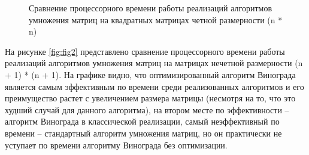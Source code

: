 \begin{figure}[h!]
	
	
	\caption{Сравнение процессорного времени работы реализаций алгоритмов умножения матриц на квадратных матрицах четной размерности (n * n)}
	
	\label{fig:fig1}
	
\end{figure}

\clearpage
На рисунке \ref{fig:fig2} представлено сравнение процессорного времени работы реализаций алгоритмов умножения матриц на матрицах нечетной размерности (n + 1) * (n + 1). 
На графике видно, что оптимизированный алгоритм Винограда является самым эффективным по времени среди реализованных алгоритмов и его преимущество растет с увеличением размера матрицы (несмотря на то, что это худший случай для данного алгоритма), на втором месте по эффективности -- алгоритм Винограда в классической реализации, самый неэффективный по времени -- стандартный алгоритм умножения матриц, но он практически не уступает по времени алгоритму Винограда без оптимизации.
\\
\\
\\
\\
\\
\\
\\

